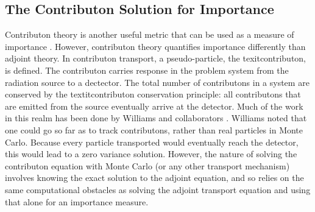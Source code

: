\subsection{The Contributon Solution for Importance}
\label{sec:ContributonImportance}

Contributon theory is another useful metric that can be used as a measure of
importance
\cite{williams_generalized_1991,williams_contributorn_1992,williams_contributon_study}.
However, contributon theory quantifies importance differently than
adjoint theory. In contributon transport, a pseudo-particle, the
texit{contributon}, is defined. The contributon carries response in the problem
system from the radiation source to a dectector. The
total number of contributons in a system are conserved by the textit{contributon
conservation principle}: all contributons that are emitted from the source
eventually arrive at the detector. Much of the work in this realm has been done
by Williams and collaborators
\cite{williams_generalized_1991,williams_contributorn_1992,williams_contributon_study}.
Williams noted that one could
go so far as to track contributons, rather than real particles in Monte Carlo.
Because every particle transported would eventually reach the detector, this
would lead to a zero variance solution. However, the nature of solving the
contributon equation with Monte Carlo (or any other transport mechanism)
involves knowing the exact solution to the adjoint equation, and so relies on
the same computational obstacles as solving the adjoint transport equation and
using that alone for an importance measure.

